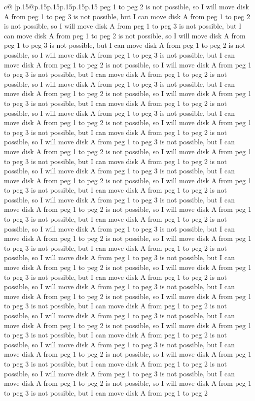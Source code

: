 \documentclass{article}
\begin{document}
{\begin{supertabular}{c@{$\;$}|p{.15\linewidth}@{}p{.15\linewidth}p{.15\linewidth}p{.15\linewidth}p{.15\linewidth}p{.15\linewidth}}
{{{peg 1 to peg 2 is not possible, so I will move disk A from peg 1 to peg 3 is not possible, but I can move disk A from peg 1 to peg 2 is not possible, so I will move disk A from peg 1 to peg 3 is not possible, but I can move disk A from peg 1 to peg 2 is not possible, so I will move disk A from peg 1 to peg 3 is not possible, but I can move disk A from peg 1 to peg 2 is not possible, so I will move disk A from peg 1 to peg 3 is not possible, but I can move disk A from peg 1 to peg 2 is not possible, so I will move disk A from peg 1 to peg 3 is not possible, but I can move disk A from peg 1 to peg 2 is not possible, so I will move disk A from peg 1 to peg 3 is not possible, but I can move disk A from peg 1 to peg 2 is not possible, so I will move disk A from peg 1 to peg 3 is not possible, but I can move disk A from peg 1 to peg 2 is not possible, so I will move disk A from peg 1 to peg 3 is not possible, but I can move disk A from peg 1 to peg 2 is not possible, so I will move disk A from peg 1 to peg 3 is not possible, but I can move disk A from peg 1 to peg 2 is not possible, so I will move disk A from peg 1 to peg 3 is not possible, but I can move disk A from peg 1 to peg 2 is not possible, so I will move disk A from peg 1 to peg 3 is not possible, but I can move disk A from peg 1 to peg 2 is not possible, so I will move disk A from peg 1 to peg 3 is not possible, but I can move disk A from peg 1 to peg 2 is not possible, so I will move disk A from peg 1 to peg 3 is not possible, but I can move disk A from peg 1 to peg 2 is not possible, so I will move disk A from peg 1 to peg 3 is not possible, but I can move disk A from peg 1 to peg 2 is not possible, so I will move disk A from peg 1 to peg 3 is not possible, but I can move disk A from peg 1 to peg 2 is not possible, so I will move disk A from peg 1 to peg 3 is not possible, but I can move disk A from peg 1 to peg 2 is not possible, so I will move disk A from peg 1 to peg 3 is not possible, but I can move disk A from peg 1 to peg 2 is not possible, so I will move disk A from peg 1 to peg 3 is not possible, but I can move disk A from peg 1 to peg 2 is not possible, so I will move disk A from peg 1 to peg 3 is not possible, but I can move disk A from peg 1 to peg 2 is not possible, so I will move disk A from peg 1 to peg 3 is not possible, but I can move disk A from peg 1 to peg 2 is not possible, so I will move disk A from peg 1 to peg 3 is not possible, but I can move disk A from peg 1 to peg 2 is not possible, so I will move disk A from peg 1 to peg 3 is not possible, but I can move disk A from peg 1 to peg 2 is not possible, so I will move disk A from peg 1 to peg 3 is not possible, but I can move disk A from peg 1 to peg 2 is not possible, so I will move disk A from peg 1 to peg 3 is not possible, but I can move disk A from peg 1 to peg 2 is not possible, so I will move disk A from peg 1 to peg 3 is not possible, but I can move disk A from peg 1 to peg 2 is not possible, so I will move disk A from peg 1 to peg 3 is not possible, but I can move disk A from peg 1 to peg 2 is not possible, so I will move disk A from peg 1 to peg 3 is not possible, but I can move disk A from peg 1 to peg 2 }}}
\end{supertabular}}
\end{document}
